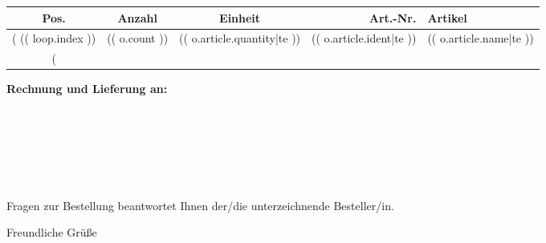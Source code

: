 \documentclass[DIN]{scrlttr2}
\begin{document}
\sffamily
\begin{letter}{}
\opening{}

\begin{longtable}{cccrp{8cm}}
Pos. & Anzahl & Einheit & Art.-Nr. & Artikel\\
\endhead
\hline
(%
(( loop.index )) & (( o.count )) & (( o.article.quantity|te )) & (( o.article.ident|te )) & (( o.article.name|te ))\\
(%
\hline
\end{longtable}

\textbf{Rechnung und Lieferung an:}\\

\begin{center}
\parbox{7cm}{%
    \\
    \\
    \\
    \\
    \\
}
\end{center}

Fragen zur Bestellung beantwortet Ihnen der/die unterzeichnende Besteller/in.

\closing{Freundliche Grüße}
\end{letter}
\end{document}
